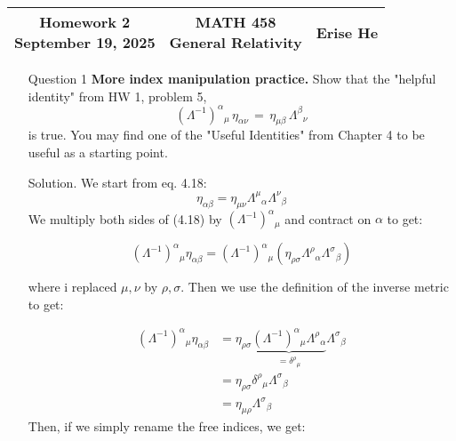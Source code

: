 \documentclass[12pt]{article}
\begin{document}
\thispagestyle{plain}
\vspace{-4ex}  %


\begin{center}
\begin{tabular}{*{3}{c}}
    \parbox[t]{0.3\linewidth}{\centering\textbf{Homework 2\\September 19, 2025}}
    & \parbox[t]{0.3\linewidth}{\centering\textbf{MATH 458\\General Relativity}}
    & \parbox[t]{0.3\linewidth}{\centering\textbf{Erise He}}\\[1em]
    \hline
\end{tabular}
\end{center}

\bigskip


\begin{enumerate}
  \item[Question 1] \textbf{More index manipulation practice.} Show that the "helpful identity" from HW 1, problem 5,
  \[
  (\Lambda^{-1})^{\alpha}{}_{\mu}\,\eta_{\alpha\nu} \,=\, \eta_{\mu\beta}\,\Lambda^{\beta}{}_{\nu}
  \]
  is true. You may find one of the "Useful Identities" from Chapter 4 to be useful as a starting point.
  
  \item[Solution.] 
    We start from eq. 4.18:
   $$\eta_{\alpha \beta}=\eta_{\mu \nu} \Lambda^\mu{ }_\alpha \Lambda^\nu{ }_\beta$$
   We multiply both sides of (4.18) by $\left(\Lambda^{-1}\right)^\alpha{ }_\mu$ and contract on $\alpha$ to get:
  
   $$\left(\Lambda^{-1}\right)^\alpha{ }_\mu \eta_{\alpha \beta}=\left(\Lambda^{-1}\right)^\alpha{ }_\mu\left(\eta_{\rho \sigma} \Lambda^\rho{ }_\alpha \Lambda^\sigma{ }_\beta\right)$$

   where i replaced $\mu, \nu$ by $\rho, \sigma$. Then we use the definition of the inverse metric to get:

   $$
  \begin{aligned}
  \left(\Lambda^{-1}\right)^\alpha{ }_\mu \eta_{\alpha \beta} & =\eta_{\rho \sigma} \underbrace{\left(\Lambda^{-1}\right)^\alpha{ }_\mu \Lambda^\rho{ }_\alpha}_{=\delta^\rho{ }_\mu} \Lambda^\sigma{ }_\beta \\
  & =\eta_{\rho \sigma} \delta^\rho{ }_\mu \Lambda^\sigma{ }_\beta\\
  & =\eta_{\mu \rho}  \Lambda^\sigma{ }_\beta
  \end{aligned}
  $$
  Then, if we simply rename the free indices, we get:


\end{enumerate}
\end{document}
